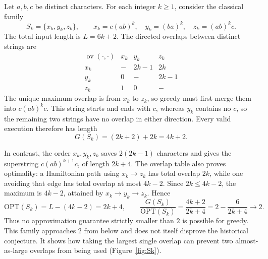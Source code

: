 \documentclass[11pt,a4paper]{article}   %
\theoremstyle{compact}
\theoremstyle{compactdef}
\newcommand{\OPT}{\mathrm{OPT}}
\newcommand{\GR}{G}                         %
\newcommand{\ov}{\operatorname{ov}}         %
\begin{document}
Let $a,b,c$ be distinct characters. For each integer $k\ge1$, consider
the classical family~\cite{BJLTY94}
\[
  S_k=\{x_k,y_k,z_k\},\qquad
  x_k=c(ab)^k,\quad y_k=(ba)^k,\quad z_k=(ab)^kc.
\]
The total input length is $L=6k+2$. The directed overlaps between distinct
strings are
\[
\begin{array}{c|ccc}
  \ov(\cdot,\cdot) & x_k & y_k & z_k\\ \hline
  x_k & - & 2k-1 & 2k\\
  y_k & 0 & - & 2k-1\\
  z_k & 1 & 0 & -
\end{array}
\]
The unique maximum overlap is from $x_k$ to $z_k$, so greedy must first
merge them into $c(ab)^kc$. This string starts and ends with $c$, whereas
$y_k$ contains no $c$, so the remaining two strings have no overlap in
either direction. Every valid execution therefore has length
\[
  \GR(S_k)=(2k+2)+2k=4k+2.
\]

In contrast, the order $x_k,y_k,z_k$ saves $2(2k-1)$ characters and gives
the superstring $c(ab)^{k+1}c$, of length $2k+4$. The overlap table also
proves optimality: a Hamiltonian path using $x_k\to z_k$ has total overlap
$2k$, while one avoiding that edge has total overlap at most $4k-2$.
Since $2k\le4k-2$, the maximum is $4k-2$, attained by
$x_k\to y_k\to z_k$. Hence
\[
  \OPT(S_k)=L-(4k-2)=2k+4,
  \qquad
  \frac{\GR(S_k)}{\OPT(S_k)}
  =\frac{4k+2}{2k+4}
  =2-\frac{6}{2k+4}\longrightarrow2.
\]
Thus no approximation guarantee strictly smaller than $2$ is possible
for greedy. This family approaches $2$ from below and does not itself
disprove the historical conjecture. It shows how taking the largest
single overlap can prevent two almost-as-large overlaps from being used
(Figure~\ref{fig:Sk}).
\end{document}
